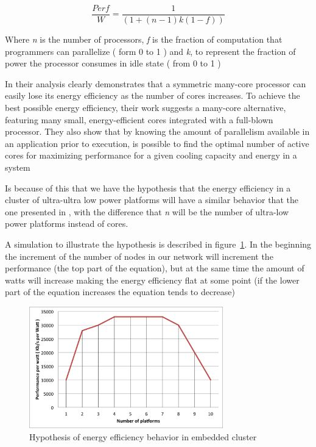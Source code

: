 \begin{equation}\label{eq:1}
\frac{Perf}{W} = \frac{1}{(1 + (n -1 ) k (1 - f))}
\end{equation}

Where \textit{n} is the number of processors,  \textit{f} is the fraction of
computation that programmers can parallelize  ( form 0 to 1 ) and \textit{k}, to
represent the fraction of power the processor consumes in idle state  ( from 0
to 1 )

In \cite{Dong} their analysis clearly demonstrates that a symmetric many-core
processor can easily  lose its energy efficiency as the number of cores
increases. To achieve the  best possible energy efficiency, their  work
suggests a many-core alternative, featuring many small, energy-efficient cores
integrated with a full-blown processor. They also show that by knowing the
amount of parallelism available in an application prior to execution, is
possible to  find the optimal number of active cores for maximizing performance
for a given cooling capacity and energy in a system

Is because of this that we have the hypothesis that the energy efficiency in a
cluster of ultra-ultra low power platforms will have a similar behavior that
the one presented in \cite{Dong} , with the difference that \textit{n} will be
the number of ultra-low power platforms instead of cores. 

A simulation to illustrate the hypothesis is described in figure~\ref{fig:1.2}.
In the beginning the increment of the number of nodes in our network will
increment the performance (the top part of the equation), but at the same time
the amount of watts will increase making the energy efficiency flat at some
point (if the lower part of the equation increases the equation tends to
decrease)

\begin{figure}[H]
\centering
\includegraphics[width=0.75\textwidth]{images/hypothesys.png}
\caption{Hypothesis of energy efficiency behavior in embedded cluster}
\label{fig:1.2}
\end{figure}

